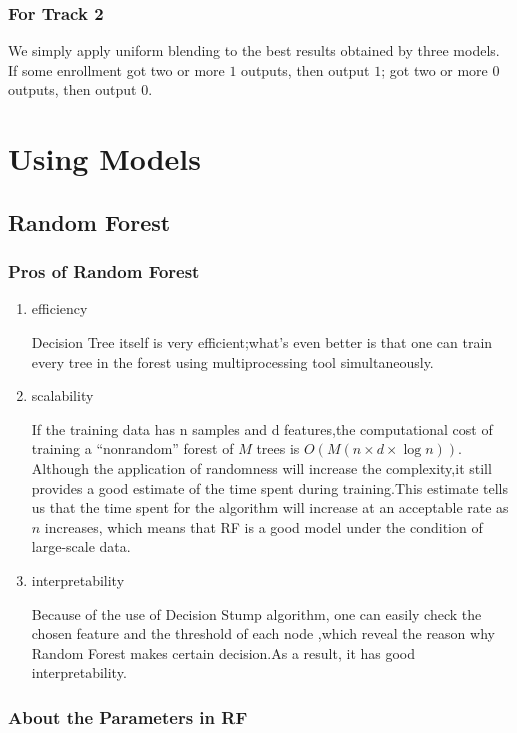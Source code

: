 \documentclass[12pt]{article}
\newcommand{\ParTh}[1]{\left(#1\right)}
\begin{document}
\subsubsection{For Track 2}

We simply apply uniform blending to the best results obtained by three models. If some enrollment got two or more $1$ outputs, then output $1$; got two or more $0$ outputs, then output $0$.

\section{Using Models}

\subsection{Random Forest}

\subsubsection{Pros of Random Forest}

\begin{enumerate}
	\item efficiency
	
	Decision Tree itself is very efficient;what’s even better is that one can train every tree in the forest using multiprocessing tool simultaneously.
	\item scalability
	
	If the training data has n samples and d features,the computational cost of training a ``nonrandom'' forest of $M$ trees is $O\ParTh{M\ParTh{n\times d \times\log n}}$. Although the application of randomness will increase the complexity,it still provides a good estimate of the time spent during training.This estimate tells us that the time spent for the algorithm will increase at an acceptable rate as $n$ increases, which means that RF is a good model under the condition of large-scale data.
	\item interpretability
	
	Because of the use of Decision Stump algorithm, one can easily check the chosen feature and the threshold of each node ,which reveal the reason why Random Forest makes certain decision.As a result, it has good interpretability.
\end{enumerate}

\subsubsection{About the Parameters in RF}
\end{document}

